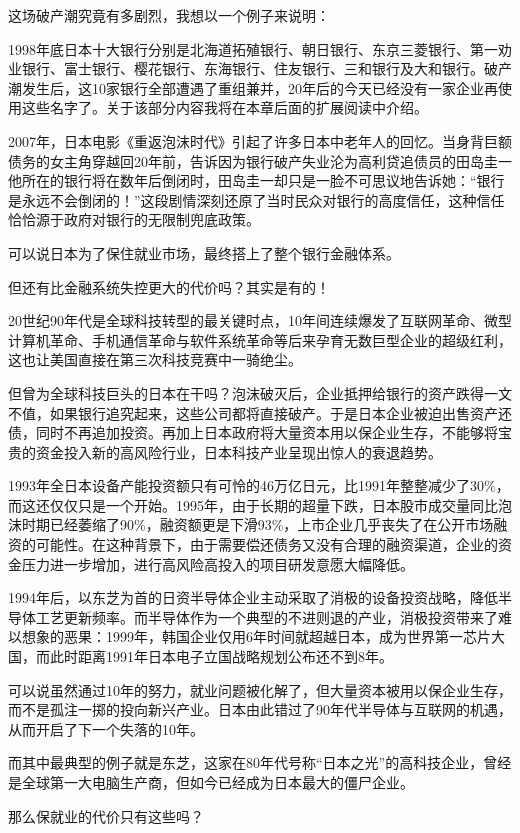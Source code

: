 这场破产潮究竟有多剧烈，我想以一个例子来说明：

1998年底日本十大银行分别是北海道拓殖银行、朝日银行、东京三菱银行、第一劝业银行、富士银行、樱花银行、东海银行、住友银行、三和银行及大和银行。破产潮发生后，这10家银行全部遭遇了重组兼并，20年后的今天已经没有一家企业再使用这些名字了。关于该部分内容我将在本章后面的扩展阅读中介绍。

2007年，日本电影《重返泡沫时代》引起了许多日本中老年人的回忆。当身背巨额债务的女主角穿越回20年前，告诉因为银行破产失业沦为高利贷追债员的田岛圭一他所在的银行将在数年后倒闭时，田岛圭一却只是一脸不可思议地告诉她：“银行是永远不会倒闭的！”这段剧情深刻还原了当时民众对银行的高度信任，这种信任恰恰源于政府对银行的无限制兜底政策。

可以说日本为了保住就业市场，最终搭上了整个银行金融体系。

但还有比金融系统失控更大的代价吗？其实是有的！

20世纪90年代是全球科技转型的最关键时点，10年间连续爆发了互联网革命、微型计算机革命、手机通信革命与软件系统革命等后来孕育无数巨型企业的超级红利，这也让美国直接在第三次科技竞赛中一骑绝尘。

但曾为全球科技巨头的日本在干吗？泡沫破灭后，企业抵押给银行的资产跌得一文不值，如果银行追究起来，这些公司都将直接破产。于是日本企业被迫出售资产还债，同时不再追加投资。再加上日本政府将大量资本用以保企业生存，不能够将宝贵的资金投入新的高风险行业，日本科技产业呈现出惊人的衰退趋势。

1993年全日本设备产能投资额只有可怜的46万亿日元，比1991年整整减少了30\%，而这还仅仅只是一个开始。1995年，由于长期的超量下跌，日本股市成交量同比泡沫时期已经萎缩了90\%，融资额更是下滑93\%，上市企业几乎丧失了在公开市场融资的可能性。在这种背景下，由于需要偿还债务又没有合理的融资渠道，企业的资金压力进一步增加，进行高风险高投入的项目研发意愿大幅降低。

1994年后，以东芝为首的日资半导体企业主动采取了消极的设备投资战略，降低半导体工艺更新频率。而半导体作为一个典型的不进则退的产业，消极投资带来了难以想象的恶果：1999年，韩国企业仅用6年时间就超越日本，成为世界第一芯片大国，而此时距离1991年日本电子立国战略规划公布还不到8年。

可以说虽然通过10年的努力，就业问题被化解了，但大量资本被用以保企业生存，而不是孤注一掷的投向新兴产业。日本由此错过了90年代半导体与互联网的机遇，从而开启了下一个失落的10年。

而其中最典型的例子就是东芝，这家在80年代号称“日本之光”的高科技企业，曾经是全球第一大电脑生产商，但如今已经成为日本最大的僵尸企业。

那么保就业的代价只有这些吗？

